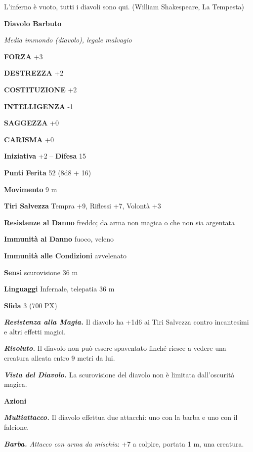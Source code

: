 \begin{multicols}{2}
\begin{changemargin}{0.3cm}{0.3cm}\begin{enfasi}{L'inferno è vuoto, tutti i diavoli sono qui. (William Shakespeare, La Tempesta)}\end{enfasi}\end{changemargin}\medskip

\medskip{}\textbf{Diavolo Barbuto}

\textit{Media immondo (diavolo), legale malvagio}

\textbf{FORZA} +3

\textbf{DESTREZZA} +2

\textbf{COSTITUZIONE} +2

\textbf{INTELLIGENZA} -1

\textbf{SAGGEZZA} +0

\textbf{CARISMA} +0

\textbf{Iniziativa} +2 -- \textbf{Difesa} 15

\textbf{Punti Ferita} 52 (8d8 + 16)

\textbf{Movimento} 9 m

\textbf{Tiri Salvezza} Tempra +9, Riflessi +7, Volontà +3

\textbf{Resistenze al Danno} freddo; da arma non magica o che non sia argentata

\textbf{Immunità al Danno} fuoco, veleno

\textbf{Immunità alle Condizioni} avvelenato

\textbf{Sensi} scurovisione 36 m

\textbf{Linguaggi} Infernale, telepatia 36 m

\textbf{Sfida} 3 (700 PX)

\textit{\textbf{Resistenza alla Magia.}} Il diavolo ha +1d6 ai Tiri Salvezza contro incantesimi e altri effetti magici.

\textit{\textbf{Risoluto.}} Il diavolo non può essere spaventato finché riesce a vedere una creatura alleata entro 9 metri da lui.

\textit{\textbf{Vista del Diavolo.}} La scurovisione del diavolo non è limitata dall'oscurità magica.

\textbf{Azioni}

\textit{\textbf{Multiattacco.}} Il diavolo effettua due attacchi: uno con la barba e uno con il falcione.

\textit{\textbf{Barba.} Attacco con arma da mischia}: +7 a colpire, portata 1 m, una creatura.


\end{multicols}
